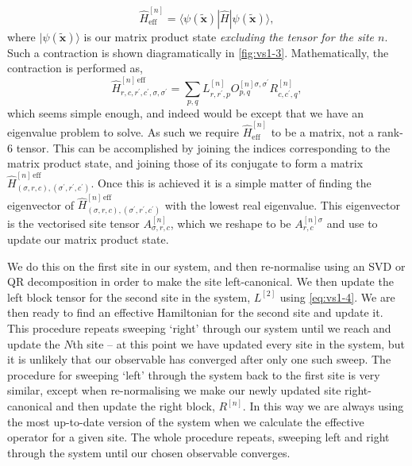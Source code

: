 \begin{equation}
\hat{H}_{\mathrm{eff}}^{[n]} = \langle \psi(\tilde{\mathbf{x}}) | \hat{H} | \psi(\tilde{\mathbf{x}}) \rangle,
\label{eq:vs1-8}
\end{equation}
where \(|\psi(\tilde{\mathbf{x}}) \rangle \) is our matrix product state \emph{excluding the tensor for the site \(n\)}. Such a contraction is shown diagramatically in \cref{fig:vs1-3}. Mathematically, the contraction is performed as,
\begin{equation}
\hat{H}^{[n]\, \mathrm{eff}}_{r,c,r^{\prime},c^{\prime},\sigma,\sigma^{\prime}} = \sum_{p,q} L^{[n]}_{r,r^{\prime},p} O^{[n] \sigma, \sigma^{\prime}}_{p,q} R^{[n]}_{c,c^{\prime},q},
\label{eq:vs1-9}
\end{equation}
which seems simple enough, and indeed would be except that we have an eigenvalue problem to solve. As such we require \(\hat{H}_{\mathrm{eff}}^{[n]}\) to be a matrix, not a rank-6 tensor. This can be accomplished by joining the indices corresponding to the matrix product state, and joining those of its conjugate to form a matrix \(\hat{H}^{[n]\, \mathrm{eff}}_{(\sigma ,r,c), (\sigma^{\prime},r^{\prime},c^{\prime})}\). Once this is achieved it is a simple matter of finding the eigenvector of \(\hat{H}^{[n]\, \mathrm{eff}}_{(\sigma ,r,c), (\sigma^{\prime},r^{\prime},c^{\prime})}\) with the lowest real eigenvalue. This eigenvector is the vectorised site tensor \(A^{[n]}_{\sigma, r, c}\), which we reshape to be \(A^{[n] \sigma}_{r,c}\) and use to update our matrix product state.

We do this on the first site in our system, and then re-normalise using an SVD or QR decomposition in order to make the site left-canonical. We then update the left block tensor for the second site in the system, \(L^{[2]}\) using \cref{eq:vs1-4}. We are then ready to find an effective Hamiltonian for the second site and update it. This procedure repeats sweeping `right' through our system until we reach and update the \(N\)th site -- at this point we have updated every site in the system, but it is unlikely that our observable has converged after only one such sweep. The procedure for sweeping `left' through the system back to the first site is very similar, except when re-normalising we make our newly updated site right-canonical and then update the right block, \(R^{[n]}\). In this way we are always using the most up-to-date version of the system when we calculate the effective operator for a given site. The whole procedure repeats, sweeping left and right through the system until our chosen observable converges.

